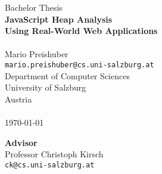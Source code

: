 \documentclass[10pt,fleqn, titlepage]{article}
\begin{document}

	\begin{titlepage}
		\centering

		\vspace*{\fill}
		{\LARGE
		Bachelor Thesis									\\ \bigskip
		\textbf{JavaScript Heap Analysis 				\\
				Using Real-World Web Applications}}		\\ \bigskip
		~ \\ \bigskip
		\Large Mario Preishuber 						\\ \smallskip
		\large
		\texttt{mario.preishuber@cs.uni-salzburg.at}	\\ \bigskip
		Department of Computer Sciences					\\ \smallskip
		University of Salzburg							\\ \smallskip
		Austria											\\ \bigskip
		~ \\ \bigskip
		\today
		\vspace*{\fill}

		\textbf{Advisor} 								\\ \bigskip
		Professor Christoph Kirsch						\\ \smallskip
		\texttt{ck@cs.uni-salzburg.at}					\\ \bigskip
	\end{titlepage}

	

	

	

	
	
	
	
	
	
	

	\appendix
	

	
\end{document}

